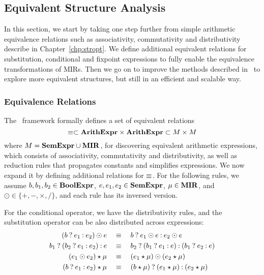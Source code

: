 \subsection{Equivalent Structure Analysis}
\label{po:sub:equivalence_analysis}

In this section, we start by taking one step further from simple arithmetic
equivalence relations such as associativity, commutativity and distributivity
describe in Chapter~\ref{chp:stropt}.  We define additional equivalent
relations for substitution, conditional and fixpoint expressions to fully
enable the equivalence transformations of MIRs.  Then we go on to improve the
methods described in \soap~to explore more equivalent structures, but still in
an efficient and scalable way.

\subsubsection{Equivalence Relations}

The \soap~framework formally defines a set of equivalent relations
\begin{equation}
    \equiv \subset \mathbf{ArithExpr} \times \mathbf{ArithExpr} \subset M \times M
\end{equation}
where $M = \mathbf{SemExpr} \cup \mathbf{MIR}$, for discovering equivalent arithmetic
expressions, which consists of associativity, commutativity and distributivity,
as well as reduction rules that propagates constants and simplifies
expressions.  We now expand it by defining additional relations for $\equiv$.
For the following rules, we assume $b, b_1, b_2 \in \mathbf{BoolExpr}$, $e, e_1, e_2
\in \mathbf{SemExpr}$, $\mu \in \mathbf{MIR}$, and $\odot \in \{+, -, \times, /\}$, and
each rule has its inversed version.

For the conditional operator, we have the distributivity rules, and the
substitution operator can be also distributed across expressions:
\begin{equation}
    \begin{aligned}
        \left(\select{b}{e_1}{e_2}\right) \odot e
        & \quad \eqrel \quad
        \select{b}{e_1 \odot e}{e_2 \odot e} \\
        \select{b_1}{\left(\select{b_2}{e_1}{e_2}\right)}{e}
        & \quad \eqrel \quad
        \select{b_2}{%
            \left(\select{b_1}{e_1}{e}\right)}{%
            \left(\select{b_1}{e_2}{e}\right)} \\
        \left( e_1 \odot e_2 \right) \expand \mu
        & \quad \eqrel \quad
        \left( e_1 \expand \mu \right) \odot \left( e_2 \expand \mu \right) \\
        \left( \select{b}{e_1}{e_2} \right) \expand \mu
        & \quad \eqrel \quad
        \select{%
            \left( b \expand \mu \right)}{%
            \left( e_1 \expand \mu \right)}{%
            \left( e_2 \expand \mu \right)}
    \end{aligned}
\end{equation}

